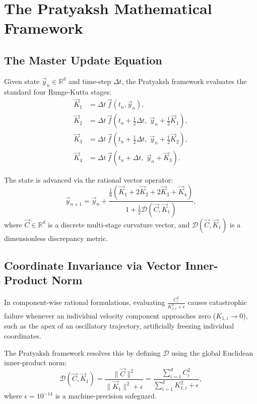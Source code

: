 \documentclass[11pt,a4paper]{article}
\theoremstyle{definition}
\begin{document}
\section{The Pratyaksh Mathematical Framework}

\subsection{The Master Update Equation}
Given state $\vec{y}_n \in \mathbb{R}^d$ and time-step $\Delta t$, the Pratyaksh framework evaluates the standard four Runge-Kutta stages:
\begin{align}
    \vec{K}_1 &= \Delta t \, \vec{f}(t_n, \vec{y}_n), \label{eq:k1} \\
    \vec{K}_2 &= \Delta t \, \vec{f}\left(t_n + \tfrac{1}{2}\Delta t, \; \vec{y}_n + \tfrac{1}{2}\vec{K}_1\right), \label{eq:k2} \\
    \vec{K}_3 &= \Delta t \, \vec{f}\left(t_n + \tfrac{1}{2}\Delta t, \; \vec{y}_n + \tfrac{1}{2}\vec{K}_2\right), \label{eq:k3} \\
    \vec{K}_4 &= \Delta t \, \vec{f}\left(t_n + \Delta t, \; \vec{y}_n + \vec{K}_3\right). \label{eq:k4}
\end{align}

The state is advanced via the rational vector operator:
\begin{equation}
    \vec{y}_{n+1} = \vec{y}_n + \frac{\frac{1}{6}\left(\vec{K}_1 + 2\vec{K}_2 + 2\vec{K}_3 + \vec{K}_4\right)}{1 + \frac{1}{2}\mathcal{D}(\vec{C}, \vec{K}_1)},
    \label{eq:master}
\end{equation}
where $\vec{C} \in \mathbb{R}^d$ is a discrete multi-stage curvature vector, and $\mathcal{D}(\vec{C}, \vec{K}_1)$ is a dimensionless discrepancy metric.

\subsection{Coordinate Invariance via Vector Inner-Product Norm}
In component-wise rational formulations, evaluating $\frac{C_i^2}{K_{1,i}^2 + \epsilon}$ causes catastrophic failure whenever an individual velocity component approaches zero ($K_{1,i} \to 0$), such as the apex of an oscillatory trajectory, artificially freezing individual coordinates.

The Pratyaksh framework resolves this by defining $\mathcal{D}$ using the global Euclidean inner-product norm:
\begin{equation}
    \mathcal{D}(\vec{C}, \vec{K}_1) = \frac{\|\vec{C}\|^2}{\|\vec{K}_1\|^2 + \epsilon} = \frac{\sum_{i=1}^d C_i^2}{\sum_{i=1}^d K_{1,i}^2 + \epsilon},
    \label{eq:vector_norm}
\end{equation}
where $\epsilon = 10^{-14}$ is a machine-precision safeguard.
\end{document}
